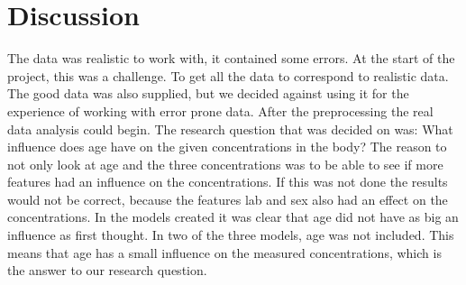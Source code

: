 \documentclass{article}
\begin{document}
  \section{Discussion}
    The data was realistic to work with, it contained some errors. At the start of the project, this was a challenge. To get all the data to correspond to realistic data.
    The good data was also supplied, but we decided against using it for the experience of working with error prone data.
    After the preprocessing the real data analysis could begin.
    The research question that was decided on was: What influence does age have on the given concentrations in the body?
    The reason to not only look at age and the three concentrations was to be able to see if more features had an influence on the concentrations.
    If this was not done the results would not be correct, because the features lab and sex also had an effect on the concentrations.
    In the models created it was clear that age did not have as big an influence as first thought.
    In two of the three models, age was not included.
    This means that age has a small influence on the measured concentrations, which is the answer to our research question.
    
\end{document}
